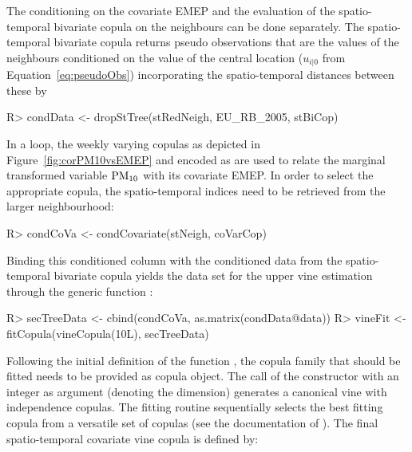 \documentclass[article,nojss]{jss}
\begin{document}
The conditioning on the covariate EMEP and the evaluation of the spatio-temporal bivariate copula on the neighbours can be done separately. The spatio-temporal bivariate copula returns pseudo observations that are the values of the neighbours conditioned on the value of the central location ($u_{i|0}$ from Equation~\ref{eq:pseudoObs}) incorporating the spatio-temporal distances between these by

\begin{Schunk}
\begin{Sinput}
R> condData <- dropStTree(stRedNeigh, EU_RB_2005, stBiCop)
\end{Sinput}
\end{Schunk}

In a loop, the weekly varying copulas as depicted in Figure~\ref{fig:corPM10vsEMEP} and encoded as  are used to relate the marginal transformed variable $\rm{PM}_{10}$ with its covariate EMEP. In order to select the appropriate copula, the spatio-temporal indices need to be retrieved from the larger neighbourhood:

\begin{Schunk}
\begin{Sinput}
R> condCoVa <- condCovariate(stNeigh, coVarCop)
\end{Sinput}
\end{Schunk}

 Binding this conditioned column  with the conditioned data from the spatio-temporal bivariate copula  yields the data set for the upper vine estimation through the generic function :

\begin{Schunk}
\begin{Sinput}
R> secTreeData <- cbind(condCoVa, as.matrix(condData@data))
R> vineFit <- fitCopula(vineCopula(10L), secTreeData)
\end{Sinput}
\end{Schunk}

Following the initial definition of the function , the copula family that should be fitted needs to be provided as copula object. The call of the constructor  with an integer as argument (denoting the dimension) generates a canonical vine with independence copulas. The fitting routine sequentially selects the best fitting copula from a versatile set of copulas (see the documentation of ). The final spatio-temporal covariate vine copula is defined by:
\end{document}
